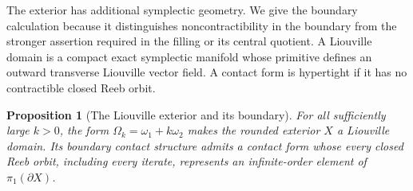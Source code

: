 \documentclass[11pt]{amsart}
\newtheorem{proposition}[theorem]{Proposition}
\theoremstyle{definition}
\theoremstyle{remark}
\begin{document}
The exterior has additional symplectic geometry. We give the boundary
calculation because it distinguishes noncontractibility in the boundary
from the stronger assertion required in the filling or its central
quotient. A Liouville domain is a compact exact symplectic manifold
whose primitive defines an outward transverse Liouville vector field.
A contact form is hypertight if it has no contractible closed Reeb orbit.

\begin{proposition}[The Liouville exterior and its boundary]\label{prop:liouville}
For all sufficiently large $k>0$, the form
$\Omega_k=\omega_1+k\omega_2$ makes the rounded exterior $X$ a
Liouville domain. Its boundary contact structure admits a contact form
whose every closed Reeb orbit, including every iterate, represents an
infinite-order element of $\pi_1(\partial X)$.
\end{proposition}
\end{document}
